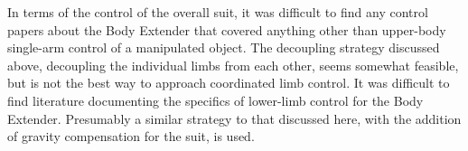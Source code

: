 In terms of the control of the overall suit, it was difficult to find any control papers about the Body Extender that covered anything other than upper-body single-arm control of a manipulated object.  The decoupling strategy discussed above, decoupling the individual limbs from each other, seems somewhat feasible, but is not the best way to approach coordinated limb control.  It was difficult to find literature documenting the specifics of lower-limb control for the Body Extender.  Presumably a similar strategy to that discussed here, with the addition of gravity compensation for the suit, is used.
  
% 







